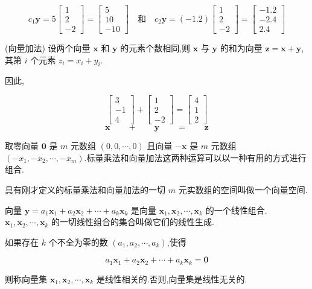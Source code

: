 \[
c_1\bm{y} = 5\begin{bmatrix} 1 \\ 2 \\ -2 \end{bmatrix} = \begin{bmatrix} 5 \\ 10 \\ -10 \end{bmatrix}
\quad \text{和} \quad
c_2\bm{y} = (-1.2)\begin{bmatrix} 1 \\ 2 \\ -2 \end{bmatrix} = \begin{bmatrix} -1.2 \\ -2.4 \\ 2.4 \end{bmatrix}
\]

 (向量加法) 设两个向量 $\bm{x}$ 和 $\bm{y}$ 的元素个数相同,则 $\bm{x}$ 与 $\bm{y}$ 的和为向量 $\bm{z} = \bm{x} + \bm{y}$,其第 $i$ 个元素 $z_i = x_i + y_i$.

因此,

\[
\begin{bmatrix} 3 \\ -1 \\ 4 \end{bmatrix} + \begin{bmatrix} 1 \\ 2 \\ -2 \end{bmatrix} = \begin{bmatrix} 4 \\ 1 \\ 2 \end{bmatrix}
\]
\[
\bm{x} \qquad + \qquad \bm{y} \qquad = \qquad \bm{z}
\]

取零向量 $\bm{0}$ 是 $m$ 元数组 $(0, 0, \cdots, 0)$ 且向量 $-\bm{x}$ 是 $m$ 元数组 $(-x_1, -x_2, \cdots, -x_m)$.标量乘法和向量加法这两种运算可以以一种有用的方式进行组合.

 具有刚才定义的标量乘法和向量加法的一切 $m$ 元实数组的空间叫做一个向量空间.

 向量 $\bm{y} = a_1\bm{x}_1 + a_2\bm{x}_2 + \cdots + a_k\bm{x}_k$ 是向量 $\bm{x}_1, \bm{x}_2, \cdots, \bm{x}_k$ 的一个线性组合. $\bm{x}_1, \bm{x}_2, \cdots, \bm{x}_k$ 的一切线性组合的集合叫做它们的线性生成.

 如果存在 $k$ 个不全为零的数 $(a_1, a_2, \cdots, a_k)$,使得

\[
a_1\bm{x}_1 + a_2\bm{x}_2 + \cdots + a_k\bm{x}_k = \bm{0}
\]

则称向量集 $\bm{x}_1, \bm{x}_2, \cdots, \bm{x}_k$ 是线性相关的.否则,向量集是线性无关的.
